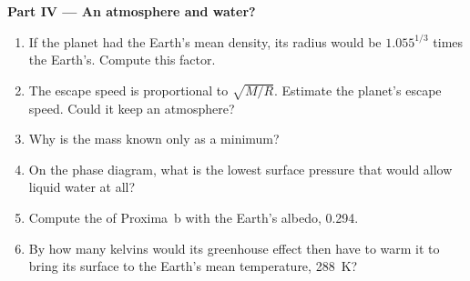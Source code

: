 \begin{problem}
\medskip
\noindent\textbf{Part IV --- An atmosphere and water?}
\begin{enumerate}[resume]
  \item If the planet had the Earth's mean density, its radius would be
        $1.055^{1/3}$ times the Earth's. Compute this factor.
  \item The escape speed is proportional to $\sqrt{M/R}$. Estimate the
        planet's escape speed. Could it keep an atmosphere?
  \item Why is the mass known only as a minimum?
  \item On the phase diagram, what is the lowest surface pressure that would
        allow liquid water at all?
  \item Compute the  of Proxima~b with the Earth's
        albedo, 0.294.
  \item By how many kelvins would its greenhouse effect then have to warm
        it to bring its surface to the Earth's mean temperature,
        \qty{288}{K}?
\end{enumerate}
\end{problem}
